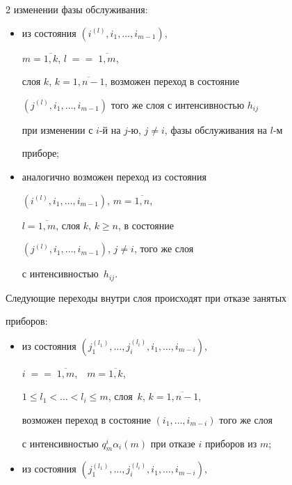 \begin{multicols}{2}
изменении фазы обслуживания:


\begin{itemize}


\item из состояния $\left ( i^{(l)},i_1,\ldots,i_{m-1}\right )$,


$m=\overline{1,k}$, $l\;=$\linebreak $=\;\overline{1,m}$,


слоя $k$, $k=\overline{1,n-1}$, возможен переход в состояние


$\left( j^{(l)},i_1,\ldots, i_{m-1}\right )$ того же слоя с интенсивностью $h_{ij}$


при изменении с $i$-й на $j$-ю, $j\ne i$, фазы обслуживания на $l$-м


приборе;


\item


аналогично возможен переход из состояния


$\left ( i^{(l)},i_1,\ldots,i_{m-1}\right )$, $m=\overline{1,n}$,


$l=\overline{1,m}$, слоя $k$,  $k\ge n$, в состояние


$\left ( j^{(l)},i_1,\ldots,i_{m-1}\right )$, $j\ne i$, того же слоя


с интенсивностью~$h_{ij}$.


\end{itemize}





Следующие переходы внутри слоя происходят при отказе занятых


приборов:


\begin{itemize}


\item из состояния $\left (j_1^{(l_1)},\ldots,j_i^{(l_i)},i_1,\ldots,i_{m-i}\right )$,


$i\;=$\linebreak $=\;\overline{1,m}$,\ \ $m=\overline{1,k}$,


$1\le l_1<\ldots<l_i\le m$, слоя~$k$, $k=\overline{1,n-1}$,


возможен переход в состояние $(i_1,\ldots,i_{m-i})$ того же слоя


с интенсивностью $q^{i}_{m}\alpha_i(m)$ при отказе $i$ приборов из $m$;


\item


из состояния $\left ( j_1^{(l_1)},\ldots,j_i^{(l_i)},i_1,\ldots,i_{m-i}\right )$,



\end{itemize}
\end{multicols}
